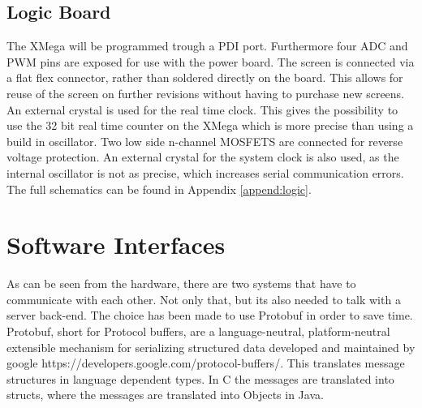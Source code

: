 \subsection{Logic Board}
The XMega will be programmed trough a PDI port. Furthermore four ADC and PWM pins are exposed for use with the power board. The screen is connected via a flat flex connector, rather than soldered directly on the board. This allows for reuse of the screen on further revisions without having to purchase new screens.\newpar
An external crystal is used for the real time clock. This gives the possibility to use the 32 bit real time counter on the XMega which is more precise than using a build in oscillator. Two low side n-channel MOSFETS are connected for reverse voltage protection. An external crystal for the system clock is also used, as the internal oscillator is not as precise, which increases serial communication errors.\newpar
The full schematics can be found in Appendix \ref{append:logic}.

\section{Software Interfaces}
As can be seen from the hardware, there are two systems that have to communicate with each other. Not only that, but its also needed to talk with a server back-end. The choice has been made to use Protobuf in order to save time. Protobuf, short for Protocol buffers, are a language-neutral, platform-neutral extensible mechanism for serializing structured data developed and maintained by google https://developers.google.com/protocol-buffers/. This translates message structures in language dependent types. In C the messages are translated into structs, where the messages are translated into Objects in Java.
